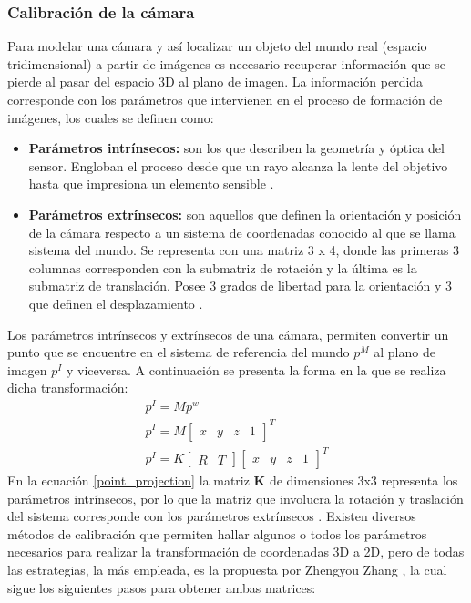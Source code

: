 \subsubsection{Calibración de la cámara}\label{calibration_section}
Para modelar una cámara y así localizar un objeto del mundo real (espacio tridimensional) a partir de imágenes es necesario recuperar información que se pierde al pasar del espacio 3D al plano de imagen. La información perdida corresponde con los parámetros que intervienen en el proceso de formación de imágenes, los cuales se definen como:
\begin{itemize}
\item \textbf{Parámetros intrínsecos:} son los que describen la geometría y óptica del sensor. Engloban el proceso desde que un rayo alcanza la lente del objetivo hasta que impresiona un elemento sensible  \cite{RSSFernando_homogeneusC}.
\item \textbf{Parámetros extrínsecos:} son aquellos que definen la orientación y posición de la cámara respecto a un sistema de coordenadas conocido al que se llama sistema del mundo. Se representa con una matriz 3 x 4, donde las primeras 3 columnas corresponden con la submatriz de rotación y la última es la submatriz de translación. Posee 3 grados de libertad para la orientación y 3 que definen el desplazamiento  \cite{RSSFernando_homogeneusC}.
\end{itemize} 
Los parámetros intrínsecos y extrínsecos de una cámara, permiten convertir un punto que se encuentre en el sistema de referencia del mundo $p^{M}$ al plano de imagen $p^{I}$ y viceversa. A continuación se presenta la forma en la que se realiza dicha transformación:
\begin{align}
    p^{I} = M p^{w} \\
    p^{I} = M \begin{bmatrix}
            x & y & z & 1
            \end{bmatrix}^{T} \\
    p^{I} = K \begin{bmatrix}R & T\end{bmatrix} \begin{bmatrix}
            x & y & z & 1
            \end{bmatrix}^{T}  \label{point_projection}
\end{align}
En la ecuación \eqref{point_projection} la matriz \textbf{K} de dimensiones 3x3 representa los parámetros intrínsecos, por lo que la matriz que involucra la rotación y traslación del sistema corresponde con los parámetros extrínsecos \cite[p~56]{Szeliski2022}. Existen diversos métodos de calibración que permiten hallar algunos o todos los parámetros necesarios para realizar la transformación de coordenadas 3D a 2D, pero de todas las estrategias, la más empleada, es la propuesta por Zhengyou Zhang \cite{Zhang2000}, la cual sigue los siguientes pasos para obtener ambas matrices:
